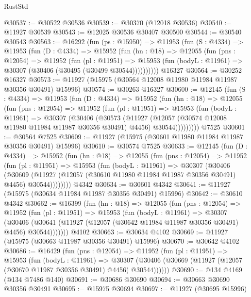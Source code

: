 \begin{lexlean}{RustStd}
\begin{coremodule}
@30537 := @30522 @30536
@30539 := @30370 (@12018 @30536)
@30540 := @11927 @30539
@30543 := @12025 @30536 @30407 @30500
@30544 := @30540 @30543
@30563 := @16292
    (fun (ps : @15950) =>
    @11953
      (fun (S : @4334) =>
      @11953
        (fun (D : @4334) =>
        @15952
          (fun (hn : @18) =>
          @12055
            (fun (pns : @12054) =>
            @11952
              (fun (pl : @11951) =>
              @15953 (fun (bodyL : @11961) => @30307 (@30406 (@30495 (@30499 @30544))))))))))
    @16327
@30564 := @30252 @16327
@30573 := @11927 (@15975 (@30564 @12008 @11980 @11984 @11987 @30356 @30491) @15996)
@30574 := @30263 @16327
@30600 := @12145
    (fun (S : @4334) =>
    @11953
      (fun (D : @4334) =>
      @15952
        (fun (hn : @18) =>
        @12055
          (fun (pns : @12054) =>
          @11952
            (fun (pl : @11951) =>
            @15953
              (fun (bodyL : @11961) =>
              @30307
                (@30406
                  (@30573
                    (@11927
                      (@12057 (@30574 @12008 @11980 @11984 @11987 @30356 @30491) @4456)
                      @30544)))))))))
    @7525
@30601 := @30564 @7525
@30609 := @11927 (@15975 (@30601 @11980 @11984 @11987 @30356 @30491) @15996)
@30610 := @30574 @7525
@30633 := @12145
    (fun (D : @4334) =>
    @15952
      (fun (hn : @18) =>
      @12055
        (fun (pns : @12054) =>
        @11952
          (fun (pl : @11951) =>
          @15953
            (fun (bodyL : @11961) =>
            @30307
              (@30406
                (@30609
                  (@11927 (@12057 (@30610 @11980 @11984 @11987 @30356 @30491) @4456) @30544))))))))
    @4342
@30634 := @30601 @4342
@30641 := @11927 (@15975 (@30634 @11984 @11987 @30356 @30491) @15996)
@30642 := @30610 @4342
@30662 := @16399
    (fun (hn : @18) =>
    @12055
      (fun (pns : @12054) =>
      @11952
        (fun (pl : @11951) =>
        @15953
          (fun (bodyL : @11961) =>
          @30307
            (@30406
              (@30641 (@11927 (@12057 (@30642 @11984 @11987 @30356 @30491) @4456) @30544)))))))
    @4102
@30663 := @30634 @4102
@30669 := @11927 (@15975 (@30663 @11987 @30356 @30491) @15996)
@30670 := @30642 @4102
@30686 := @16429
    (fun (pns : @12054) =>
    @11952
      (fun (pl : @11951) =>
      @15953
        (fun (bodyL : @11961) =>
        @30307 (@30406 (@30669 (@11927 (@12057 (@30670 @11987 @30356 @30491) @4456) @30544))))))
@30690 := @134 @4169 (@134 @7486 @140)
@30691 := @30686 @30690
@30694 := @30663 @30690 @30356 @30491
@30695 := @15975 @30694
@30697 := @11927 (@30695 @15996)

\end{coremodule}
\end{lexlean}
